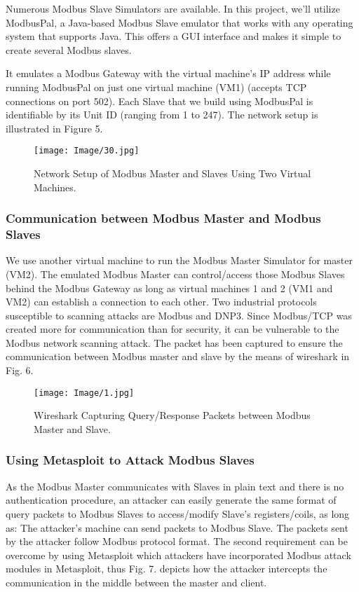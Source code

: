 \documentclass[letterpaper,10pt,conference]{IEEEtran}
\begin{document}
Numerous Modbus Slave Simulators are available. In this project, we'll utilize ModbusPal, a Java-based Modbus Slave emulator that works with any operating system that supports Java. This offers a GUI interface and makes it simple to create several Modbus slaves.

It emulates a Modbus Gateway with the virtual machine's IP address while running ModbusPal on just one virtual machine (VM1) (accepts TCP connections on port 502). Each Slave that we build using ModbusPal is identifiable by its Unit ID (ranging from 1 to 247).
The network setup is illustrated in Figure 5.
\begin{figure}[h!]
\centering
\texttt{[image: Image/30.jpg]}
\caption{Network Setup of Modbus Master and Slaves Using Two Virtual Machines.}
\label{Fig. 4}
\end{figure}


\subsubsection{Communication between Modbus Master and Modbus Slaves}
We use another virtual machine to run the Modbus Master Simulator for master (VM2). The emulated Modbus Master can control/access those Modbus Slaves behind the Modbus Gateway as long as virtual machines 1 and 2 (VM1 and VM2) can establish a connection to each other. Two industrial protocols susceptible to scanning attacks are Modbus and DNP3. Since Modbus/TCP was created more for communication than for security, it can be vulnerable to the Modbus network scanning attack. The packet has been captured to ensure the communication between Modbus master and slave by the means of wireshark in Fig. 6.

\begin{figure}[h!]
\centering
\texttt{[image: Image/1.jpg]}
\caption{Wireshark Capturing Query/Response Packets between Modbus Master and Slave.}
\label{Fig. 5}
\end{figure}

\subsubsection{Using Metasploit to Attack Modbus Slaves}
As the Modbus Master communicates with Slaves in plain text and there is no authentication procedure, an attacker can easily generate the same format of query packets to Modbus Slaves to access/modify Slave's registers/coils, as long as:
The attacker's machine can send packets to Modbus Slave.
The packets sent by the attacker follow Modbus protocol format.
The second requirement can be overcome by using Metasploit which attackers have incorporated Modbus attack modules in Metasploit, thus  Fig. 7. depicts how the attacker intercepts the communication in the middle between the master and client.
\end{document}
